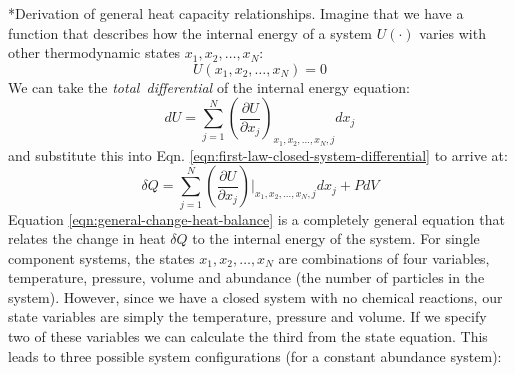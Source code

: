 \documentclass[11pt]{article}
\makeatletter
\theoremstyle{definition}
\renewcommand\subsection{\@startsection
	{subsection}{2}{0mm}
	{-0.05in}
	{0.5\baselineskip}
	{\normalfont\normalsize\bfseries}}
\makeatother
\begin{document}
\subsection*{Derivation of general heat capacity relationships.}
Imagine that we have a function that describes how the internal energy of a system $U(\cdot)$ varies with other thermodynamic states $x_{1},x_{2},\hdots,x_{N}$:
\begin{equation}
	U\left(x_{1},x_{2},\hdots,x_{N}\right) = 0
\end{equation}
We can take the \emph{total~differential} of the internal energy equation:
\begin{equation}
	dU = \sum_{j = 1}^{N}\left(\frac{\partial{U}}{\partial{x_{j}}}\right)_{x_{1},x_{2},\hdots,x_{N},j}dx_{j}
\end{equation}and substitute this into Eqn. \eqref{eqn:first-law-closed-system-differential} to arrive at:
\begin{equation}\label{eqn:general-change-heat-balance}
	\delta{Q} = \sum_{j = 1}^{N}\left(\frac{\partial{U}}{\partial{x_{j}}}\right)\Bigr|_{x_{1},x_{2},\hdots,x_{N},j}dx_{j} + PdV
\end{equation}
Equation \eqref{eqn:general-change-heat-balance} is a completely general equation that relates the change in heat $\delta{Q}$ to
the internal energy of the system. For single component systems, the states $x_{1},x_{2},\hdots,x_{N}$ are combinations of
four variables, temperature, pressure, volume and abundance (the number of particles in the system).
However, since we have a closed system with no chemical reactions, our state variables are simply the temperature, pressure and volume.
If we specify two of these variables we can calculate the third from the state equation.
This leads to three possible system configurations (for a constant abundance system):
\end{document}
